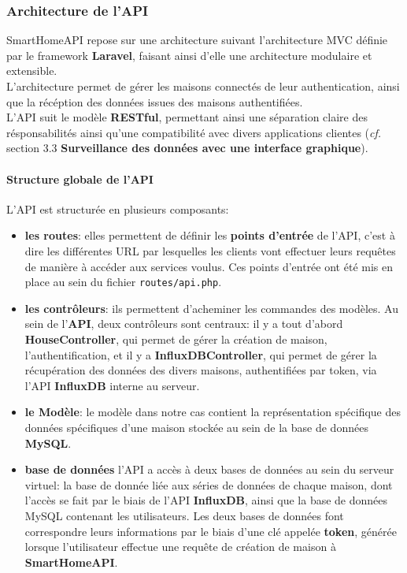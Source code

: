 \documentclass[10pt, a4paper]{report}
\begin{document}
	\subsubsection{Architecture de l'API}
	SmartHomeAPI repose sur une architecture suivant l'architecture MVC définie par le framework \textbf{Laravel}, faisant ainsi d'elle une architecture modulaire et extensible.\\
	L'architecture permet de gérer les maisons connectés de leur authentication, ainsi que la récéption des données issues des maisons authentifiées.\\
	L'API suit le modèle \textbf{RESTful}, permettant ainsi une séparation claire des résponsabilités ainsi qu'une compatibilité avec divers applications clientes (\textit{cf.} section 3.3 \textbf{Surveillance des données avec une interface graphique}).
	
	\paragraph{Structure globale de l'API}
	
	L'API est structurée en plusieurs composants:
	\begin{itemize}
		\item \textbf{les routes}: elles permettent de définir les \textbf{points d'entrée} de l'API, c'est à dire les différentes URL par lesquelles les clients vont effectuer leurs requêtes de manière à accéder aux services voulus. Ces points d'entrée ont été mis en place au sein du fichier \texttt{routes/api.php}.
		\item \textbf{les contrôleurs}: ils permettent d'acheminer les commandes des modèles. Au sein de l'\textbf{API}, deux contrôleurs sont centraux: il y a tout d'abord \textbf{HouseController}, qui permet de gérer la création de maison, l'authentification, et il y a \textbf{InfluxDBController}, qui permet de gérer la récupération des données des divers maisons, authentifiées par token, via l'API \textbf{InfluxDB} interne au serveur.
		\item \textbf{le Modèle}: le modèle dans notre cas contient la représentation spécifique des données spécifiques d'une maison stockée au sein de la base de données \textbf{MySQL}.
		\item \textbf{base de données} l'API a accès à deux bases de données au sein du serveur virtuel: la base de donnée liée aux séries de données de chaque maison, dont l'accès se fait par le biais de l'API \textbf{InfluxDB}, ainsi que la base de données MySQL contenant les utilisateurs. Les deux bases de données font correspondre leurs informations par le biais d'une clé appelée \textbf{token}, générée lorsque l'utilisateur effectue une requête de création de maison à \textbf{SmartHomeAPI}.
	\end{itemize}
	
\end{document}
